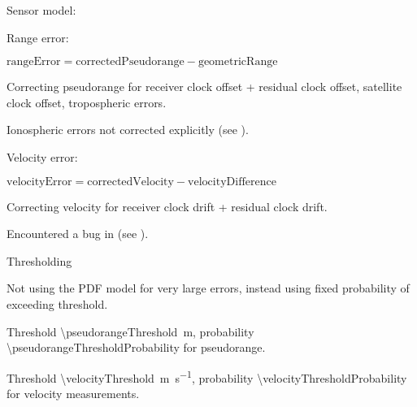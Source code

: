 \begin{compactitem}
\begin{compactitem}
    \item
    Sensor model:
    \begin{compactitem}
        \item Range error:
        \begin{compactitem}
            \item \(\mathrm{rangeError} = \mathrm{correctedPseudorange} - \mathrm{geometricRange}\)
            \item Correcting pseudorange for
                receiver clock offset + residual clock offset,
                satellite clock offset,
                tropospheric errors.
            \item Ionospheric errors not corrected explicitly (see ).
        \end{compactitem}
        \item Velocity error:
        \begin{compactitem}
            \item \(\mathrm{velocityError} = \mathrm{correctedVelocity} - \mathrm{velocityDifference}\)
            \item Correcting velocity for receiver clock drift + residual clock drift.
            \item Encountered a bug in \sirf (see ).
        \end{compactitem}
        \item Thresholding
        \begin{compactitem}
            \item Not using the PDF model for very large errors, instead using
                  fixed probability of exceeding threshold.
            \item Threshold \SI{\pseudorangeThreshold}{\meter}, probability \num{\pseudorangeThresholdProbability} for pseudorange.
            \item Threshold \SI{\velocityThreshold}{\meter\per\second}, probability \num{\velocityThresholdProbability} for velocity measurements.
        \end{compactitem}


\end{compactitem}
\end{compactitem}
\end{compactitem}
